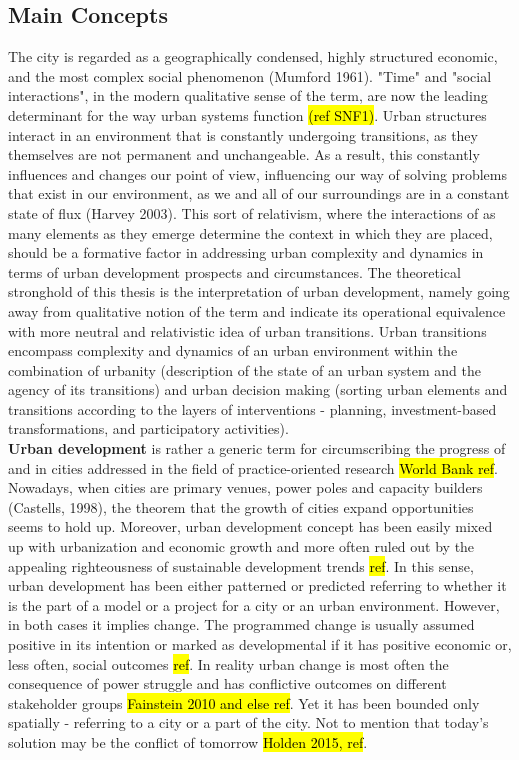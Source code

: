 \documentclass[11pt]{report}
\begin{document}
\subsection{Main Concepts}
The city is regarded as a geographically condensed, highly structured economic, and the most complex social phenomenon (Mumford 1961). "Time" and "social interactions", in the modern qualitative sense of the term, are now the leading determinant for the way urban systems function \hl{(ref SNF1)}. Urban structures interact in an environment that is constantly undergoing transitions, as they themselves are not permanent and unchangeable. As a result, this constantly influences and changes our point of view, influencing our way of solving problems that exist in our environment, as we and all of our surroundings are in a constant state of flux (Harvey 2003). This sort of relativism, where the interactions of as many elements as they emerge determine the context in which they are placed, should be a formative factor in addressing urban complexity and dynamics in terms of urban development prospects and circumstances. The theoretical stronghold of this thesis is the interpretation of urban development, namely going away from qualitative notion of the term and indicate its operational equivalence with more neutral and relativistic idea of urban transitions. Urban transitions encompass complexity and dynamics of an urban environment within the combination of urbanity (description of the state of an urban system and the agency of its transitions) and urban decision making (sorting urban elements and transitions according to the layers of interventions - planning, investment-based transformations, and participatory activities).
\\ 
\textbf{Urban development} is rather a generic term for circumscribing the progress of and in cities addressed in the  field of practice-oriented research \hl{World Bank ref}. Nowadays, when cities are primary venues, power poles and capacity builders (Castells, 1998), the theorem that the growth of cities expand opportunities seems to hold up. Moreover, urban development concept has been easily mixed up with urbanization and economic growth and more often ruled out by the appealing righteousness of sustainable development trends \hl{ref}.  In this sense, urban development has been either patterned or predicted referring to whether it is the part of a model or a project for a city or an urban environment. However, in both cases it implies change. The programmed change is usually assumed positive in its intention or marked as developmental if it has positive economic or, less often, social outcomes \hl{ref}. In reality urban change is most often the consequence of power struggle and has conflictive outcomes on different stakeholder groups \hl{Fainstein 2010 and else ref}. Yet it has been bounded only spatially - referring to a city or a part of the city. Not to mention that today's solution may be the conflict of tomorrow \hl{Holden 2015, ref}.
\end{document}

